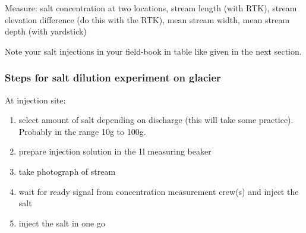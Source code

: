 \documentclass[DIV=15,halfparskip,11pt,headinclude]{scrartcl}
\begin{document}
Measure: salt concentration at two locations, stream length (with
RTK), stream elevation difference (do this with the RTK), mean stream
width, mean stream depth (with yardstick)

Note your salt injections in your field-book in table like given in the next section.


\subsubsection{Steps for salt dilution experiment on glacier}
\label{sec-2-2}

At injection site:
\begin{enumerate}
\item select amount of salt depending on discharge (this will take some
practice).  Probably in the range 10g to 100g.
\item prepare injection solution in the 1l measuring beaker
 \item take photograph of stream
\item wait for ready signal from concentration measurement crew(s) and
  inject the salt
\item inject the salt in one go
\end{enumerate}
\end{document}
